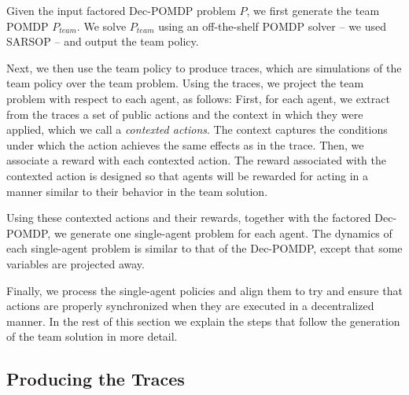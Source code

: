 \documentclass[letterpaper]{article} %
\theoremstyle{definition}
\newcommand{\eliran}[1]{\textbf{[\color{red}ELIRAN:#1]}}
\begin{document}
Given the input factored Dec-POMDP problem $P$, we first generate the team POMDP $P_{team}$. We solve $P_{team}$ using an off-the-shelf POMDP solver -- we used SARSOP \cite{SARSOP} -- and output the team policy. 

Next, we then use the team policy to produce traces, which are simulations of the team policy over the team problem. Using the traces, we project the team problem with respect to each agent, as follows:
First, for each agent, we extract from the traces a set of public actions and the context in which they were applied, which we call a {\em contexted actions}. The context captures the conditions under which the action achieves the same effects as in the trace. Then, we associate a reward with each  contexted action. The reward associated with the contexted action is designed so that agents will be rewarded for acting in a manner similar to their
behavior in the team solution.

Using these contexted actions and their rewards, together with the factored Dec-POMDP, we  generate
one single-agent problem for each agent. The dynamics of each single-agent problem is similar to that of the Dec-POMDP, except that some variables are projected away. 

Finally, we process the single-agent policies and align them to try and ensure that actions are properly synchronized when they are executed in a decentralized manner. 
In the rest of this section we explain the steps that follow the
generation of the team solution in more detail.



\subsection{Producing the Traces}
\end{document}
